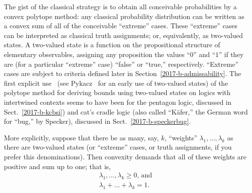 The gist of the classical strategy is to obtain all conceivable probabilities by a
convex polytope method:
any classical probability distribution can be written as a convex sum of all of the conceivable ``extreme'' cases.
These ``extreme'' cases can be interpreted as classical truth assignments; or, equivalently,
as two-valued states. A two-valued state is a function on the propositional structure of elementary observables,
assigning any proposition the values ``$0$'' and ``$1$'' if they are (for a particular ``extreme'' case)
``false'' or ``true,'' respectively.
``Extreme'' cases are subject to  criteria defined later in Section~\ref{2017-b-admissability}.
The first explicit use~\cite{svozil-2001-cesena,svozil-2001-eua,svozil-2008-ql,svozil-2016-s}
(see Pykacz~\cite{Pykacz1989} for an early use of two-valued states)
of the polytope method for deriving bounds using two-valued states on logics with intertwined contexts
seems to have been for the pentagon logic, discussed in Sect.~\ref{2017-b-kcbsi}) and cat's cradle logic
(also called ``K\"afer,'' the German word for ``bug,'' by Specker), discussed in Sect.~\ref{2017-b-speckerbug}.


More explicitly, suppose that there be as many, say, $k$, ``weights'' $\lambda_1, \ldots ,\lambda_k$ as there are two-valued states
(or ``extreme'' cases, or truth assignments, if you prefer this denominations).
Then convexity demands that all of these weights are positive and sum up to one; that is,
\begin{equation}
\begin{split}
\lambda_1, \ldots , \lambda_k  \ge 0
\text{, and }
\\
\lambda_1 + \ldots + \lambda_k   = 1
.
\label{2017-b-convexity}
\end{split}
\end{equation}


